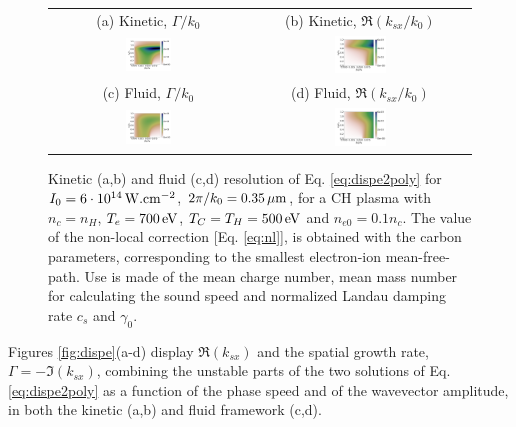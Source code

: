 \documentclass[
 reprint,
 amsmath,amssymb,
 aps,
]{revtex4-1}
\begin{document}
\begin{figure}
\begin{tabular}{cc}
(a) Kinetic, $\Gamma/k_0$ &
(b)  Kinetic, $\Re(k_{sx}/k_0)$ \\
\includegraphics[width=0.24\textwidth]{2a.png}&
\includegraphics[width=0.24\textwidth]{2b.png}\\
(c) Fluid, $\Gamma/k_0$  &
(d) Fluid, $\Re(k_{sx}/k_0)$  \\
\includegraphics[width=0.24\textwidth]{2c.png}&
\includegraphics[width=0.24\textwidth]{2d.png}
\end{tabular}
\caption{ \label{fig:dispeCH}  
Kinetic (a,b) and fluid (c,d) resolution of Eq. \eqref{eq:dispe2poly} for  $I_0 = 6\cdot 10^{14}\, \rm W.cm^{-2}$, $2\pi/k_0=0.35 \,\rm\mu m$, for a CH plasma with $n_c=n_H$, $T_e =700\,\rm  eV$, $T_C=T_H =500\,  \rm eV$ and $n_{e0}=0.1n_c$. The value of the non-local correction [Eq. \eqref{eq:nl}], is obtained with the carbon parameters, corresponding to the smallest electron-ion mean-free-path. Use is made of the mean charge number, mean mass number   for calculating the sound speed and normalized Landau damping rate $c_s$ and $\gamma_0$.
 }
\end{figure}
Figures \ref{fig:dispe}(a-d) display  $\Re(k_{sx})$ and the spatial growth rate,  $\Gamma=-\Im(k_{sx})$, combining   the  unstable parts of the two  solutions of Eq. \eqref{eq:dispe2poly} as a function of the phase speed and of the wavevector amplitude, in both the kinetic (a,b) and fluid framework (c,d).
\end{document}
